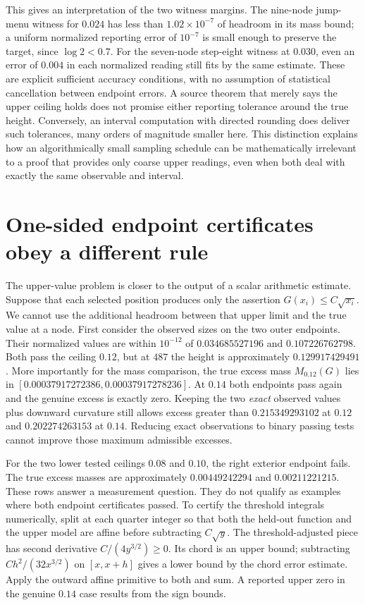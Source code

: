\documentclass[12pt,letterpaper]{article}
\begin{document}
This gives an interpretation of the two witness margins. The nine-node jump-menu witness for \(0.024\) has less than \(1.02\times10^{-7}\) of headroom in its mass bound; a uniform normalized reporting error of \(10^{-7}\) is small enough to preserve the target, since \(\log2<0.7\). For the seven-node step-eight witness at \(0.030\), even an error of \(0.004\) in each normalized reading still fits by the same estimate. These are explicit sufficient accuracy conditions, with no assumption of statistical cancellation between endpoint errors. A source theorem that merely says the upper ceiling holds does not promise either reporting tolerance around the true height. Conversely, an interval computation with directed rounding does deliver such tolerances, many orders of magnitude smaller here. This distinction explains how an algorithmically small sampling schedule can be mathematically irrelevant to a proof that provides only coarse upper readings, even when both deal with exactly the same observable and interval.

\section{One-sided endpoint certificates obey a different rule}
\label{sec:onesidednumeric}
The upper-value problem is closer to the output of a scalar arithmetic estimate. Suppose that each selected position produces only the assertion \(G(x_i)\le C\sqrt{x_i}\). We cannot use the additional headroom between that upper limit and the true value at a node. First consider the observed sizes on the two outer endpoints. Their normalized values are within \(10^{-12}\) of \(0.034685527196\) and \(0.107226762798\). Both pass the ceiling \(0.12\), but at \(487\) the height is approximately \(0.129917429491\). More importantly for the mass comparison, the true excess mass \(M_{0.12}(G)\) lies in \([0.00037917272386,0.00037917278236]\). At \(0.14\) both endpoints pass again and the genuine excess is exactly zero. Keeping the two \emph{exact} observed values plus downward curvature still allows excess greater than \(0.215349293102\) at \(0.12\) and \(0.202274263153\) at \(0.14\). Reducing exact observations to binary passing tests cannot improve those maximum admissible excesses.

For the two lower tested ceilings \(0.08\) and \(0.10\), the right exterior endpoint fails. The true excess masses are approximately \(0.00449242294\) and \(0.00211221215\). These rows answer a measurement question. They do not qualify as examples where both endpoint certificates passed. To certify the threshold integrals numerically, split at each quarter integer so that both the held-out function and the upper model are affine before subtracting \(C\sqrt y\). The threshold-adjusted piece has second derivative \(C/(4y^{3/2})\ge0\). Its chord is an upper bound; subtracting \(C h^2/(32x^{3/2})\) on \([x,x+h]\) gives a lower bound by the chord error estimate. Apply the outward affine primitive to both and sum. A reported upper zero in the genuine \(0.14\) case results from the sign bounds.
\end{document}

